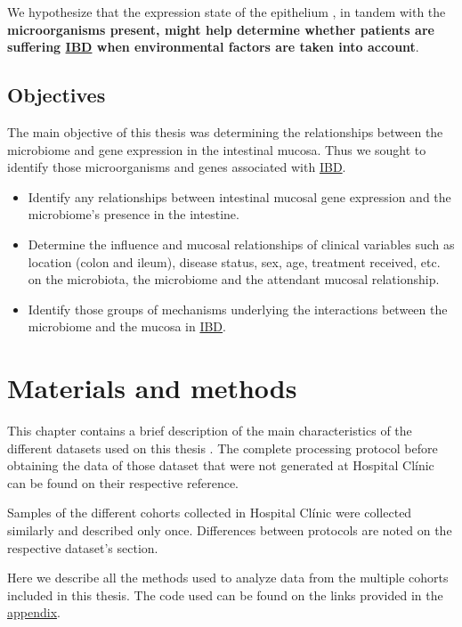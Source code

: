 \documentclass[
  12pt,
  a4paper,
  twoside,
  openright]{book}
\begin{document}
We hypothesize that the expression state of the epithelium , in tandem with the \textbf{microorganisms present, might help determine whether patients are suffering \protect\hyperlink{acronyms_IBD}{IBD} when environmental factors are taken into account}.

\hypertarget{objectives}{%
\section{Objectives}\label{objectives}}

The main objective of this thesis was determining the relationships between the microbiome and gene expression in the intestinal mucosa.
Thus we sought to identify those microorganisms and genes associated with \protect\hyperlink{acronyms_IBD}{IBD}.

\begin{itemize}
\item
  Identify any relationships between intestinal mucosal gene expression and the microbiome's presence in the intestine.
\item
  Determine the influence and mucosal relationships of clinical variables such as location (colon and ileum), disease status, sex, age, treatment received, etc. on the microbiota, the microbiome and the attendant mucosal relationship.
\item
  Identify those groups of mechanisms underlying the interactions between the microbiome and the mucosa in \protect\hyperlink{acronyms_IBD}{IBD}.
\end{itemize}

\hypertarget{materials-and-methods}{%
\chapter{Materials and methods}\label{materials-and-methods}}

This chapter contains a brief description of the main characteristics of the different datasets used on this thesis .
The complete processing protocol before obtaining the data of those dataset that were not generated at Hospital Clínic can be found on their respective reference.

Samples of the different cohorts collected in Hospital Clínic were collected similarly and described only once.
Differences between protocols are noted on the respective dataset's section.

Here we describe all the methods used to analyze data from the multiple cohorts included in this thesis.
The code used can be found on the links provided in the \protect\hyperlink{software}{appendix}.
\end{document}
